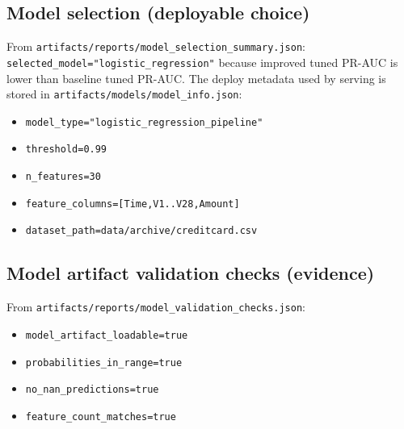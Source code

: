 \documentclass[11pt]{article}
\newcommand{\code}[1]{\texttt{#1}}
\begin{document}
\subsection{Model selection (deployable choice)}
From \code{artifacts/reports/model_selection_summary.json}: \code{selected_model="logistic_regression"} because improved tuned PR-AUC is lower than baseline tuned PR-AUC. The deploy metadata used by serving is stored in \code{artifacts/models/model_info.json}:
\begin{itemize}
  \item \code{model_type="logistic_regression_pipeline"}
  \item \code{threshold=0.99}
  \item \code{n_features=30}
  \item \code{feature_columns=[Time,V1..V28,Amount]}
  \item \code{dataset_path=data/archive/creditcard.csv}
\end{itemize}

\subsection{Model artifact validation checks (evidence)}
From \code{artifacts/reports/model_validation_checks.json}:
\begin{itemize}
  \item \code{model_artifact_loadable=true}
  \item \code{probabilities_in_range=true}
  \item \code{no_nan_predictions=true}
  \item \code{feature_count_matches=true}
\end{itemize}
\end{document}
